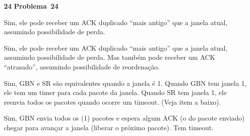 \documentclass{article}
\newcounter{exe-list}
\newenvironment{exe-list}
    {\begin{list}{\alph{exe-list}.}{\usecounter{exe-list}}}
    {\end{list}}
\newenvironment{exe}[2][Problema]
    {\newcommand{\opt}{(Opcional)}%
    \newcommand{\sketch}[1]{{\bfseries Rascunho:} ##1}%
    \medskip\par\noindent\ifthenelse{\equal{#1}{}}
        {\textbf{\large #2}}
        {\textbf{\large #1~#2}}%
    \medskip\par\noindent}
    {\medskip}
\begin{document}
\begin{exe}{24}
    \begin{exe-list}
    \item Sim, ele pode receber um ACK duplicado
        ``mais antigo'' que a janela atual,
        assumindo possibilidade de perda.
    \item Sim, ele pode receber um ACK duplicado
        ``mais antigo'' que a janela atual,
        assumindo possibilidade de perda.
        Mas também pode receber um ACK ``atrasado'',
        assumindo possibilidade de reordenação.
    \item Sim, GBN e SR são equivalentes quando a janela é 1.
        Quando GBN tem janela 1,
        ele tem um timer para cada pacote da janela.
        Quando SR tem janela 1,
        ele reenvia todos os pacotes quando ocorre um timeout.
        (Veja item a baixo).
    \item Sim, GBN envia todos os (1) pacotes e
        espera algum ACK (o do pacote enviado)
        chegar para avançar a janela
        (liberar o próximo pacote).
        Tem timeout.
    \end{exe-list}
\end{exe}
\end{document}
